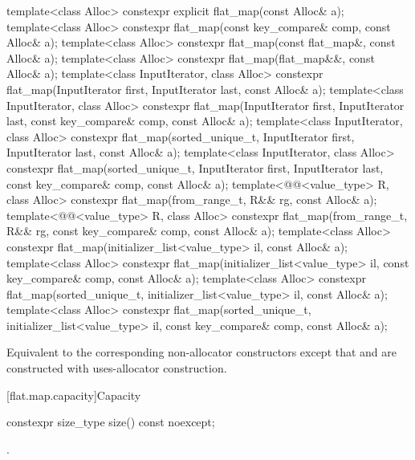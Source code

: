 %
\begin{itemdecl}
template<class Alloc>
  constexpr explicit flat_map(const Alloc& a);
template<class Alloc>
  constexpr flat_map(const key_compare& comp, const Alloc& a);
template<class Alloc>
  constexpr flat_map(const flat_map&, const Alloc& a);
template<class Alloc>
  constexpr flat_map(flat_map&&, const Alloc& a);
template<class InputIterator, class Alloc>
  constexpr flat_map(InputIterator first, InputIterator last, const Alloc& a);
template<class InputIterator, class Alloc>
  constexpr flat_map(InputIterator first, InputIterator last, const key_compare& comp,
                     const Alloc& a);
template<class InputIterator, class Alloc>
  constexpr flat_map(sorted_unique_t, InputIterator first, InputIterator last, const Alloc& a);
template<class InputIterator, class Alloc>
  constexpr flat_map(sorted_unique_t, InputIterator first, InputIterator last,
                     const key_compare& comp, const Alloc& a);
template<@@<value_type> R, class Alloc>
  constexpr flat_map(from_range_t, R&& rg, const Alloc& a);
template<@@<value_type> R, class Alloc>
  constexpr flat_map(from_range_t, R&& rg, const key_compare& comp, const Alloc& a);
template<class Alloc>
  constexpr flat_map(initializer_list<value_type> il, const Alloc& a);
template<class Alloc>
  constexpr flat_map(initializer_list<value_type> il, const key_compare& comp, const Alloc& a);
template<class Alloc>
  constexpr flat_map(sorted_unique_t, initializer_list<value_type> il, const Alloc& a);
template<class Alloc>
  constexpr flat_map(sorted_unique_t, initializer_list<value_type> il,
                     const key_compare& comp, const Alloc& a);
\end{itemdecl}

\begin{itemdescr}
\pnum
\effects
Equivalent to the corresponding non-allocator constructors
except that  and  are constructed
with uses-allocator construction.
\end{itemdescr}

[flat.map.capacity]{Capacity}

%
\begin{itemdecl}
constexpr size_type size() const noexcept;
\end{itemdecl}

\begin{itemdescr}
\pnum
\returns
{}.
\end{itemdescr}

